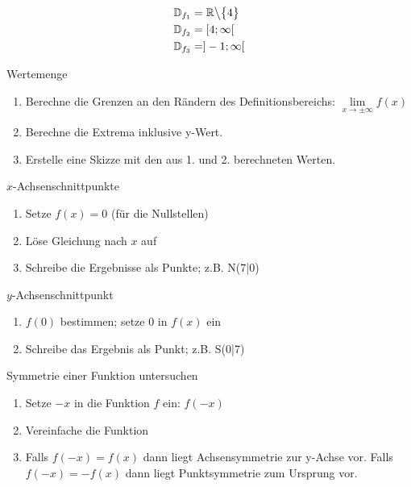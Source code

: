 \documentclass[paper=a6,landscape,ngerman,twoside=true,fontsize=12pt]{scrartcl}
\begin{document}
\begin{antwort}
	\begin{align*}
	   	  \mathbb{D}_{f_1}&=\mathbb{R}\big\backslash\big\{4\big\} \\
		  \mathbb{D}_{f_2}&=[4;\infty[ \\
		  \mathbb{D}_{f_3}&=]-1;\infty[ 
	\end{align*}
\end{antwort}
\begin{frage}
	Wertemenge
\end{frage}
\begin{antwort}
	\begin{enumerate}
		\item Berechne die Grenzen an den Rändern des Definitionsbereichs: $\lim\limits_{x \rightarrow\pm\infty}{f(x)}$
		\item Berechne die Extrema inklusive y-Wert.
		\item Erstelle eine Skizze mit den aus 1. und 2. berechneten Werten.
	\end{enumerate}
\end{antwort}
\begin{frage}
	$x$-Achsenschnittpunkte
\end{frage}
\begin{antwort}
	\begin{enumerate}
		\item Setze $f(x)=0$ (für die Nullstellen)
		\item Löse Gleichung nach $x$ auf
		\item Schreibe die Ergebnisse als Punkte; z.B. N(7|0)
	\end{enumerate}
\end{antwort}
\begin{frage}
	$y$-Achsenschnittpunkt
\end{frage}
\begin{antwort}
	\begin{enumerate}
		\item $f(0)$ bestimmen; setze $0$ in $f(x)$ ein
		\item Schreibe das Ergebnis als Punkt; z.B. S(0|7)
	\end{enumerate}
\end{antwort}
\begin{frage}
	Symmetrie einer Funktion untersuchen
\end{frage}
\begin{antwort}
	\begin{enumerate}
		\item Setze $-x$ in die Funktion $f$ ein: $f(-x)$
		\item Vereinfache die Funktion
		\item Falls $f(-x)=f(x)$ dann liegt Achsensymmetrie zur y-Achse vor. Falls $f(-x)=-f(x)$ dann liegt Punktsymmetrie zum Ursprung vor.
	\end{enumerate}
\end{antwort}
\end{document}
